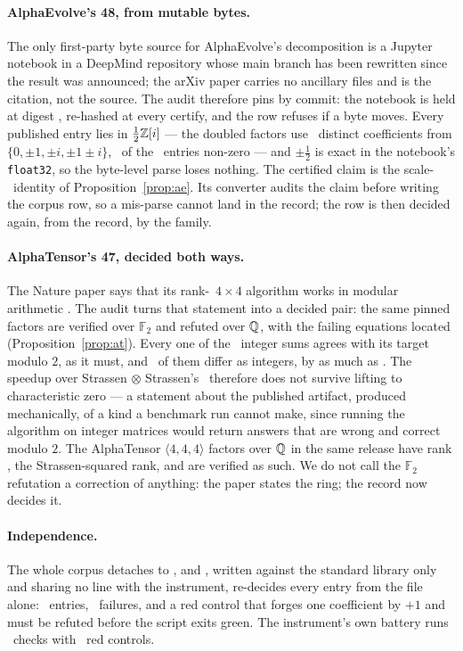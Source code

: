 \documentclass[11pt]{article}
\newcommand{\F}{\mathbb{F}}
\newcommand{\mm}[3]{\langle #1,#2,#3\rangle}
\begin{document}
\paragraph{AlphaEvolve's 48, from mutable bytes.} The only first-party byte source for AlphaEvolve's
decomposition is a Jupyter notebook in a DeepMind repository whose main branch has been rewritten since
the result was announced; the arXiv paper \cite{No25} carries no ancillary files and is the citation, not
the source. The audit therefore pins by commit: the notebook is held at digest \AEPin, re-hashed at every
certify, and the row refuses if a byte moves. Every published entry lies in $\tfrac12\mathbb{Z}[i]$ --- the doubled
factors use \AEAlphabet\ distinct coefficients from $\{0,\pm1,\pm i,\pm1\pm i\}$, \AENonzero\ of the
\AEEntries\ entries non-zero --- and $\pm\tfrac12$ is exact in the notebook's \texttt{float32}, so the
byte-level parse loses nothing. The certified claim is the scale-\AEScale\ identity of
Proposition~\ref{prop:ae}. Its converter audits the claim before writing the corpus row, so a mis-parse
cannot land in the record; the row is then decided again, from the record, by the family.

\paragraph{AlphaTensor's 47, decided both ways.} The Nature paper says that its rank-\ATRank\ $4\times4$
algorithm works in modular arithmetic \cite{Fa22}. The audit turns that statement into a decided pair: the
same pinned factors are verified over $\F_2$ and refuted over $\mathbb{Q}$, with the failing equations located
(Proposition~\ref{prop:at}). Every one of the \ATEquations\ integer sums agrees with its target modulo $2$,
as it must, and \ATQFailCount\ of them differ as integers, by as much as \ATQMaxAbs. The speedup over
Strassen$\,\otimes\,$Strassen's \StrassenSqRank\ therefore does not survive lifting to characteristic zero
--- a statement about the published artifact, produced mechanically, of a kind a benchmark run cannot make,
since running the algorithm on integer matrices would return answers that are wrong and correct modulo $2$.
The AlphaTensor $\mm444$ factors over $\mathbb{Q}$ in the same release have rank \ATQFourRank, the Strassen-squared
rank, and are verified as such. We do not call the $\F_2$ refutation a correction of anything: the paper
states the ring; the record now decides it.

\paragraph{Independence.} The whole corpus detaches to , and
, written against the standard library only and sharing no line with the
instrument, re-decides every entry from the file alone: \VerifierEntries\ entries, \VerifierFailures\
failures, and a red control that forges one coefficient by $+1$ and must be refuted before the script exits
green. The instrument's own battery runs \StrassenBatteryChecks\ checks with \StrassenBatteryReds\ red
controls.
\end{document}
